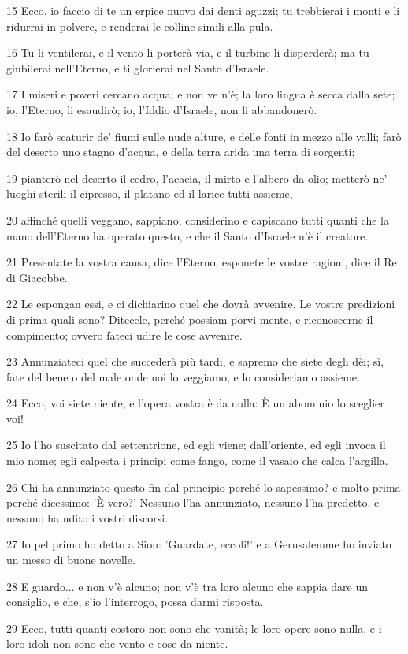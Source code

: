\par 15 Ecco, io faccio di te un erpice nuovo dai denti aguzzi; tu trebbierai i monti e li ridurrai in polvere, e renderai le colline simili alla pula.
\par 16 Tu li ventilerai, e il vento li porterà via, e il turbine li disperderà; ma tu giubilerai nell'Eterno, e ti glorierai nel Santo d'Israele.
\par 17 I miseri e poveri cercano acqua, e non ve n'è; la loro lingua è secca dalla sete; io, l'Eterno, li esaudirò; io, l'Iddio d'Israele, non li abbandonerò.
\par 18 Io farò scaturir de' fiumi sulle nude alture, e delle fonti in mezzo alle valli; farò del deserto uno stagno d'acqua, e della terra arida una terra di sorgenti;
\par 19 pianterò nel deserto il cedro, l'acacia, il mirto e l'albero da olio; metterò ne' luoghi sterili il cipresso, il platano ed il larice tutti assieme,
\par 20 affinché quelli veggano, sappiano, considerino e capiscano tutti quanti che la mano dell'Eterno ha operato questo, e che il Santo d'Israele n'è il creatore.
\par 21 Presentate la vostra causa, dice l'Eterno; esponete le vostre ragioni, dice il Re di Giacobbe.
\par 22 Le espongan essi, e ci dichiarino quel che dovrà avvenire. Le vostre predizioni di prima quali sono? Ditecele, perché possiam porvi mente, e riconoscerne il compimento; ovvero fateci udire le cose avvenire.
\par 23 Annunziateci quel che succederà più tardi, e sapremo che siete degli dèi; sì, fate del bene o del male onde noi lo veggiamo, e lo consideriamo assieme.
\par 24 Ecco, voi siete niente, e l'opera vostra è da nulla: È un abominio lo sceglier voi!
\par 25 Io l'ho suscitato dal settentrione, ed egli viene; dall'oriente, ed egli invoca il mio nome; egli calpesta i principi come fango, come il vasaio che calca l'argilla.
\par 26 Chi ha annunziato questo fin dal principio perché lo sapessimo? e molto prima perché dicessimo: 'È vero?' Nessuno l'ha annunziato, nessuno l'ha predetto, e nessuno ha udito i vostri discorsi.
\par 27 Io pel primo ho detto a Sion: 'Guardate, eccoli!' e a Gerusalemme ho inviato un messo di buone novelle.
\par 28 E guardo... e non v'è alcuno; non v'è tra loro alcuno che sappia dare un consiglio, e che, s'io l'interrogo, possa darmi risposta.
\par 29 Ecco, tutti quanti costoro non sono che vanità; le loro opere sono nulla, e i loro idoli non sono che vento e cose da niente.

